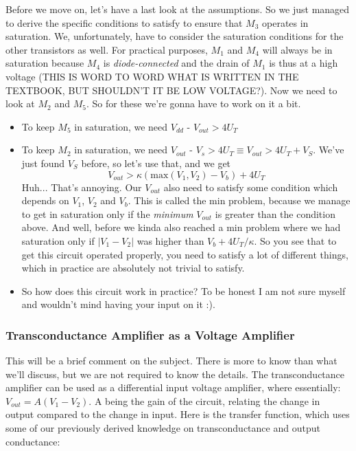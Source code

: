 Before we move on, let's have a last look at the assumptions. So we just managed to derive the specific conditions to satisfy to ensure that $M_3$ operates in saturation. We, unfortunately, have to consider the saturation conditions for the other transistors as well. For practical purposes, $M_1$ and $M_4$ will always be in saturation because $M_4$ is \textit{diode-connected} and the drain of $M_1$ is thus at a high voltage (THIS IS WORD TO WORD WHAT IS WRITTEN IN THE TEXTBOOK, BUT SHOULDN'T IT BE LOW VOLTAGE?). Now we need to look at $M_2$ and $M_5$. So for these we're gonna have to work on it a bit. 
\begin{itemize}
    \item To keep $M_5$ in saturation, we need $V_{dd}$ - $V_{out} > 4 U_T$
    \item To keep $M_2$ in saturation, we need $V_{out}$ - $V_{s} > 4 U_T \equiv V_{out} > 4 U_T +  V_S$. We've just found $V_S$ before, so let's use that, and we get
    \begin{equation}
        V_{out} > \kappa (\mathrm{max}(V_1, V_2) - V_b) + 4 U_T
    \end{equation}
    Huh... That's annoying. Our $V_{out}$ also need to satisfy some condition which depends on $V_1$, $V_2$ and $V_b$. This is called the min problem, because we manage to get in saturation only if the \textit{minimum} $V_{out}$ is greater than the condition above. And well, before we kinda also reached a min problem where we had saturation only if $|V_1 - V_2|$ was higher than $V_b + 4U_T/ \kappa$. So you see that to get this circuit operated properly, you need to satisfy a lot of different things, which in practice are absolutely not trivial to satisfy. 
    \item So how does this circuit work in practice? To be honest I am not sure myself and wouldn't mind having your input on it :). 
\end{itemize}


\subsubsection{Transconductance Amplifier as a Voltage Amplifier}\label{sec:transamp_voltage}

This will be a brief comment on the subject. There is more to know than what we'll discuss, but we are not required to know the details. The transconductance amplifier can be used as a differential input voltage amplifier, where essentially: $V_{out} = A(V_1 - V_2)$. A being the gain of the circuit, relating the change in output compared to the change in input. Here is the transfer function, which uses some of our previously derived knowledge on transconductance and output conductance: 

